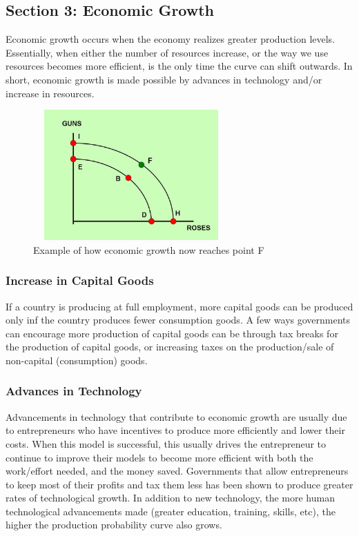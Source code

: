 \documentclass[a4paper, 12pt] {article}
\begin{document}
\subsection{Section 3: Economic Growth}
Economic growth occurs when the economy realizes greater production levels.
Essentially, when either the number of resources increase, or the way we use
resources becomes more efficient, is the only time the curve can shift outwards.
In short, economic growth is made possible by advances in technology and/or
increase in resources.

\begin{figure}
    \centering
    \includegraphics[width=7.5cm, height=5cm]{economic_growth_graph.jpg}
    \caption{Example of how economic growth now reaches point F}
    \label{fig:GnR2}
\end{figure}

\subsubsection{Increase in Capital Goods}
If a country is producing at full employment, more capital goods can be produced
only inf the country produces fewer consumption goods. A few ways governments
can encourage more production of capital goods can be through tax breaks for the
production of capital goods, or increasing taxes on the production/sale of
non-capital (consumption) goods.

\subsubsection{Advances in Technology}
Advancements in technology that contribute to economic growth are usually due to
entrepreneurs who have incentives to produce more efficiently and lower their
costs. When this model is successful, this usually drives the entrepreneur to 
continue to improve their models to become more efficient with both the work/effort
needed, and the money saved. Governments that allow entrepreneurs to keep most of
their profits and tax them less has been shown to produce greater rates of
technological growth. In addition to new technology, the more human technological
advancements made (greater education, training, skills, etc), the higher the 
production probability curve also grows.
\end{document}

